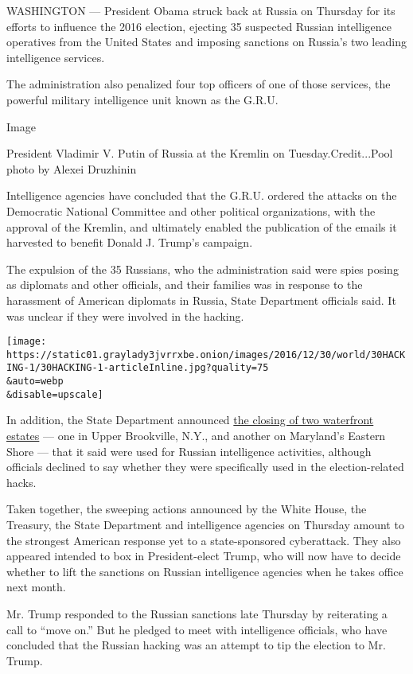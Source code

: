WASHINGTON --- President Obama struck back at Russia on Thursday for its
efforts to influence the 2016 election, ejecting 35 suspected Russian
intelligence operatives from the United States and imposing sanctions on
Russia's two leading intelligence services.

The administration also penalized four top officers of one of those
services, the powerful military intelligence unit known as the G.R.U.

Image

President Vladimir V. Putin of Russia at the Kremlin on
Tuesday.Credit...Pool photo by Alexei Druzhinin

Intelligence agencies have concluded that the G.R.U. ordered the attacks
on the Democratic National Committee and other political organizations,
with the approval of the Kremlin, and ultimately enabled the publication
of the emails it harvested to benefit Donald J. Trump's campaign.

The expulsion of the 35 Russians, who the administration said were spies
posing as diplomats and other officials, and their families was in
response to the harassment of American diplomats in Russia, State
Department officials said. It was unclear if they were involved in the
hacking.

\texttt{[image: https://static01.graylady3jvrrxbe.onion/images/2016/12/30/world/30HACKING-1/30HACKING-1-articleInline.jpg?quality=75\\\&auto=webp\\\&disable=upscale]}

In addition, the State Department announced
\href{https://www.nytimes3xbfgragh.onion/2016/12/29/us/politics/russia-spy-compounds-maryland-long-island.html}{the
closing of two waterfront estates} --- one in Upper Brookville, N.Y.,
and another on Maryland's Eastern Shore --- that it said were used for
Russian intelligence activities, although officials declined to say
whether they were specifically used in the election-related hacks.

Taken together, the sweeping actions announced by the White House, the
Treasury, the State Department and intelligence agencies on Thursday
amount to the strongest American response yet to a state-sponsored
cyberattack. They also appeared intended to box in President-elect
Trump, who will now have to decide whether to lift the sanctions on
Russian intelligence agencies when he takes office next month.

Mr. Trump responded to the Russian sanctions late Thursday by
reiterating a call to ``move on.'' But he pledged to meet with
intelligence officials, who have concluded that the Russian hacking was
an attempt to tip the election to Mr. Trump.

